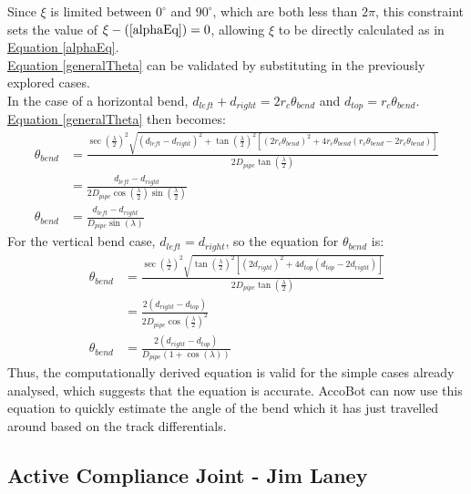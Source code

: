 \documentclass[11pt]{article}		%
\newcommand{\equationref}[1]{\hyperref[#1]{Equation \ref*{#1}}}     %
\begin{document}
			Since $\xi$ is limited between $0^\circ$ and $90^\circ$, which are both less than $2 \pi$, this constraint sets the value of $\xi - (\ref*{alphaEq}) = 0$, allowing $\xi$ to be directly calculated as in \equationref{alphaEq}.
			\\
			\equationref{generalTheta} can be validated by substituting in the previously explored cases.
			\\
			In the case of a horizontal bend, $d_{left} + d_{right} = 2 r_c \theta_{bend} $ and $d_{top} = r_c \theta_{bend}$.
			\equationref{generalTheta} then becomes:
			\begin{align*}
				\theta_{bend} &= \frac{ \sec \left( \frac{\lambda}{2} \right)^2 \sqrt{ \left( d_{left} - d_{right} \right)^2 +  \tan \left( \frac{\lambda}{2} \right)^2 \left[ \left( 2 r_c \theta_{bend} \right)^2 + 4 r_c \theta_{bend} \left( r_c \theta_{bend}  - 2 r_c \theta_{bend} \right) \right] } }{2 D_{pipe} \tan \left( \frac{\lambda}{2} \right)}
				\\
				&= \frac{d_{left} - d_{right}}{2 D_{pipe} \cos \left( \frac{\lambda}{2} \right) \sin \left( \frac{\lambda}{2} \right)}
				\\
				\theta_{bend} &= \frac{d_{left} - d_{right}}{D_{pipe} \sin \left( \lambda \right)}
			\end{align*}
			For the vertical bend case, $d_{left} = d_{right}$, so the equation for $\theta_{bend}$ is:
			\begin{align*}
				\theta_{bend} &= \frac{ \sec \left( \frac{\lambda}{2} \right)^2 \sqrt{ \tan \left( \frac{\lambda}{2} \right)^2 \left[ \left( 2 d_{right} \right)^2 + 4 d_{top} \left( d_{top} - 2 d_{right} \right) \right] } }{2 D_{pipe} \tan \left( \frac{\lambda}{2} \right)}
				\\
				&= \frac{2 \left( d_{right} - d_{top} \right)}{2 D_{pipe} \cos \left( \frac{\lambda}{2} \right)^2}
				\\
				\theta_{bend} &= \frac{2 \left( d_{right} - d_{top} \right)}{D_{pipe} \left( 1 + \cos \left( \lambda \right) \right)}
			\end{align*}
			Thus, the computationally derived equation is valid for the simple cases already analysed, which suggests that the equation is accurate.
			AccoBot can now use this equation to quickly estimate the angle of the bend which it has just travelled around based on the track differentials.
		 		
		\subsection[Active Compliance Joint]{Active Compliance Joint - Jim Laney}
		
\end{document}
